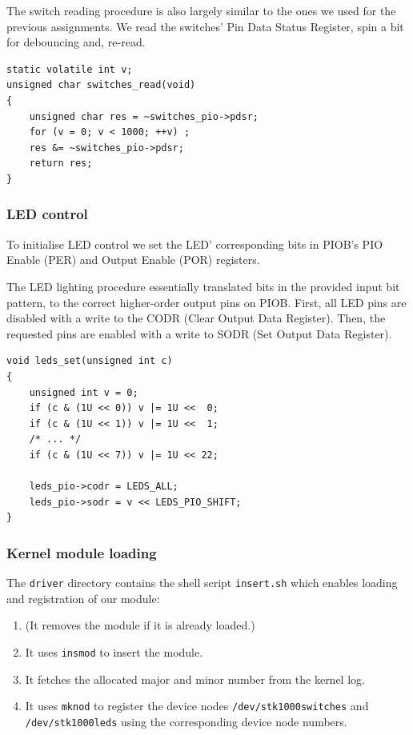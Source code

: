 \documentclass[a4paper,10pt]{article}
\newcommand{\isrc}[1]{\texttt{#1}}
\begin{document}
The switch reading procedure is also largely similar to the ones we used for
the previous assignments. We read the switches' Pin Data Status Register, spin a
bit for debouncing and, re-read.
\begin{lstlisting}
static volatile int v;
unsigned char switches_read(void)
{
    unsigned char res = ~switches_pio->pdsr;
    for (v = 0; v < 1000; ++v) ;
    res &= ~switches_pio->pdsr;
    return res;
}
\end{lstlisting}

\subsubsection{LED control}
To initialise LED control we set the LED' corresponding bits in PIOB's
PIO Enable (PER) and Output Enable (POR) registers. 

The LED lighting procedure essentially translated bits in the provided input
bit pattern, to the correct higher-order output pins on PIOB.
First, all LED pins are disabled with a write to the CODR (Clear Output Data
Register). Then, the requested pins are enabled with a write to SODR (Set
Output Data Register).
\begin{lstlisting}
void leds_set(unsigned int c)
{
    unsigned int v = 0;
    if (c & (1U << 0)) v |= 1U <<  0;
    if (c & (1U << 1)) v |= 1U <<  1;
    /* ... */
    if (c & (1U << 7)) v |= 1U << 22;

    leds_pio->codr = LEDS_ALL;
    leds_pio->sodr = v << LEDS_PIO_SHIFT;
}
\end{lstlisting}

\subsubsection{Kernel module loading}
The \texttt{driver} directory contains the shell script \texttt{insert.sh}
which enables loading and registration of our module:
\begin{enumerate}
    \item (It removes the module if it is already loaded.)
    \item It uses \isrc{insmod} to insert the module.
    \item It fetches the allocated major and minor number from the kernel log.
    \item It uses \texttt{mknod} to register the device nodes
        \texttt{/dev/stk1000switches} and \texttt{/dev/stk1000leds} using the 
        corresponding device node numbers.
\end{enumerate}
\end{document}
